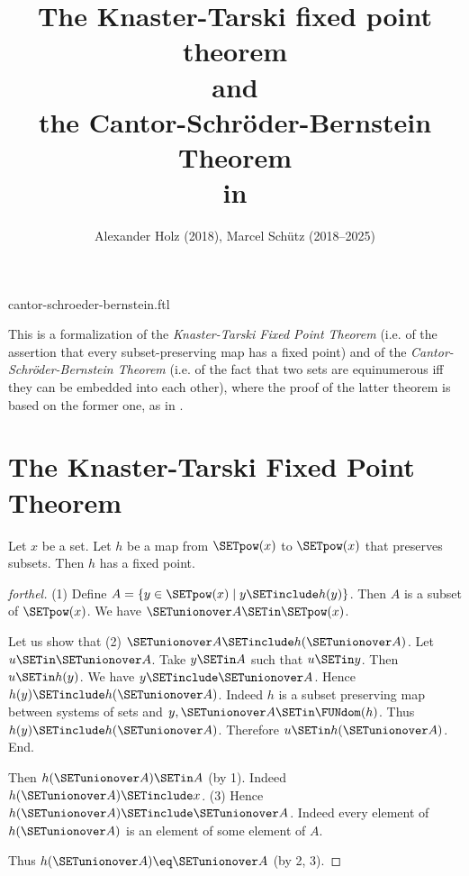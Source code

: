 \documentclass{stex}
\title{The Knaster-Tarski fixed point theorem\\and\\the Cantor-Schröder-Bernstein Theorem\\in \Naproche}
\author{Alexander Holz (2018), Marcel Schütz (2018--2025)}
\date{}
\begin{document}
\begin{smodule}{cantor-schroeder-bernstein.ftl}
\maketitle


\noindent This is a formalization of the \textit{Knaster-Tarski Fixed Point
Theorem} (i.e. of the assertion that every subset-preserving map has a fixed
point) and of the \textit{Cantor-Schröder-Bernstein Theorem} (i.e. of the
fact that two sets are equinumerous iff they can be embedded into each other),
where the proof of the latter theorem is based on the former one, as in
\cite{Schroeder2012}.

\section*{The Knaster-Tarski Fixed Point Theorem}

\begin{theorem}[forthel,title=Knaster-Tarski,id=knaster_tarski]
  Let $x$ be a set.
  Let $h$ be a map from $\SETpow(x)$ to $\SETpow(x)$ that preserves subsets.
  Then $h$ has a fixed point.
\end{theorem}
\begin{proof}[forthel]
  (1) Define $A = \{y \in \SETpow(x) \mid y \SETinclude h(y)\}$.
  Then $A$ is a subset of $\SETpow(x)$.
  We have $\SETunionover A \SETin \SETpow(x)$.

  Let us show that (2) $\SETunionover A \SETinclude h(\SETunionover A)$.
    Let $u \SETin \SETunionover A$.
    Take $y \SETin A$ such that $u \SETin y$.
    Then $u \SETin h(y)$.
    We have $y \SETinclude \SETunionover A$.
    Hence $h(y) \SETinclude h(\SETunionover A)$.
    Indeed $h$ is a subset preserving map between systems of sets and $y, \SETunionover A \SETin \FUNdom(h)$.
    Thus $h(y) \SETinclude h(\SETunionover A)$.
    Therefore $u \SETin h(\SETunionover A)$.
  End.

  Then $h(\SETunionover A) \SETin A$ (by 1).
  Indeed $h(\SETunionover A) \SETinclude x$.
  (3) Hence $h(\SETunionover A) \SETinclude \SETunionover A$.
  Indeed every element of $h(\SETunionover A)$ is an element of some element of
  $A$.

  Thus $h(\SETunionover A) \eq \SETunionover A$ (by 2, 3).
\end{proof}



\end{smodule}
\end{document}
